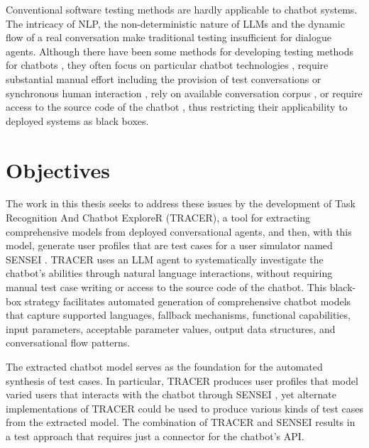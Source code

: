 Conventional software testing methods are hardly applicable to chatbot systems.
The intricacy of \ac{NLP}, the non-deterministic nature of \acp{LLM} and the dynamic flow of a real conversation make traditional testing insufficient for dialogue agents.
Although there have been some methods for developing testing methods for chatbots \cite{cuadradoIntegratingStaticQuality2024, canizaresMeasuringClusteringHeterogeneous2024}, they often focus on particular chatbot technologies \autocite{RasaTest2025}, require substantial manual effort including the provision of test conversations \autocite{CyaraBotium, RasaTest2025} or synchronous human interaction \autocite{renEvaluationTechniquesChatbot2019}, rely on available conversation corpus \autocite{vasconcelosBottesterTestingConversational2017}, or require access to the source code of the chatbot \autocite{canizaresCoveragebasedStrategiesAutomated2024, gomez-abajoMutationTestingTaskOriented2024, urricoMutaBotMutationTesting2024}, thus restricting their applicability to deployed systems as black boxes.

\section{Objectives}

The work in this thesis seeks to address these issues by the development of Task Recognition And Chatbot ExploreR (\ac{TRACER}), a tool for extracting comprehensive models from deployed conversational agents, and then, with this model, generate user profiles that are test cases for a user simulator named SENSEI \autocite{delaraAutomatedEndtoEndTesting2025, delaraSensei}.
\ac{TRACER} uses an \ac{LLM} agent to systematically investigate the chatbot's abilities through natural language interactions, without requiring manual test case writing or access to the source code of the chatbot.
This black-box strategy facilitates automated generation of comprehensive chatbot models that capture supported languages, fallback mechanisms, functional capabilities, input parameters, acceptable parameter values, output data structures, and conversational flow patterns.


The extracted chatbot model serves as the foundation for the automated synthesis of test cases.
In particular, \ac{TRACER} produces user profiles that model varied users that interacts with the chatbot through SENSEI \autocite{delaraAutomatedEndtoEndTesting2025, delaraSensei}, yet alternate implementations of \ac{TRACER} could be used to produce various kinds of test cases from the extracted model.
The combination of \ac{TRACER} and SENSEI results in a test approach that requires just a connector for the chatbot’s API.

